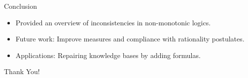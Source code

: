 \begin{frame}{Conclusion}
    \begin{itemize}
        \item Provided an overview of inconsistencies in non-monotonic logics.
        \item Future work: Improve measures and compliance with rationality postulates.
        \item Applications: Repairing knowledge bases by adding formulas.
    \end{itemize}
\end{frame}

\begin{frame}
    \begin{center}
        \Huge{Thank You!}
    \end{center}
\end{frame}
